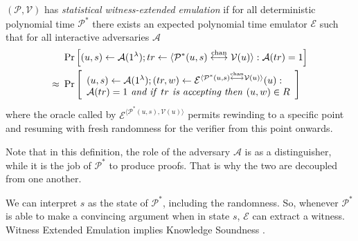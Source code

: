 \begin{definition}
$(\mathcal{P},\mathcal{V})$ has {\em statistical witness-extended emulation} if for all deterministic polynomial time $\mathcal{P}^*$ there exists an expected polynomial time emulator $\mathcal{E}$ such that for all interactive adversaries $\mathcal{A}$
\begin{align*}
& \Pr \Big{[}(u,s) \leftarrow\mathcal{A}(1^{\lambda}); tr \leftarrow \langle \mathcal{P}^*(u,s)\overset{\textnormal{chan}}{\longleftrightarrow} \mathcal{V}(u)\rangle: \mathcal{A}(tr)=1 \Big{]}\\
\approx \ & \Pr \left[ \begin{array}{l} (u,s) \leftarrow \mathcal{A}(1^{\lambda}); (tr,w) \leftarrow \mathcal{E}^{ \langle \mathcal{P}^*(u,s) \overset{\textnormal{chan}}{\longleftrightarrow} \mathcal{V}(u) \rangle } (u): \\ \mathcal{A}(tr)=1 \text{\emph{ and if }} tr \text{\emph{ is accepting then }} (u,w) \in R \end{array} \right]
\end{align*}
where the oracle called by $\mathcal{E}^{\langle \mathcal{P}^*(u,s), \mathcal{V}(u)\rangle}$ permits rewinding to a specific point and resuming with fresh randomness for the verifier from this point onwards.
\end{definition}
\noindent
Note that in this definition, the role of the adversary $\mathcal{A}$ is as a distinguisher, while it is the job of $\mathcal{P}^*$ to produce proofs. That is why the two are decoupled from one another.

We can interpret $s$ as the state of $\mathcal{P}^*$, including the randomness. So, whenever $\mathcal{P}^*$ is able to make a convincing argument when in state $s$,  $\mathcal{E}$ can extract a witness. Witness Extended Emulation implies Knowledge Soundness \cite{dissertation}.

